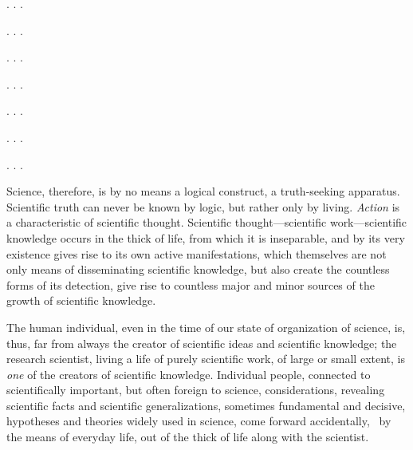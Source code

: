 \Section %

. . .

\Section %

. . .

\Section %

. . .

\Section %

. . .

\Section %

. . .

\Section %

. . .

\Section %

. . .

\Section %
Science, therefore, is by no means a logical construct, a truth-seeking
apparatus.  Scientific truth can never be known by logic, but rather only by
living.  \emph{Action }is a characteristic of scientific thought.  Scientific
thought---scientific work---scientific knowledge occurs in the thick of life,
from which it is inseparable, and by its very existence gives rise to its own
active manifestations, which themselves are not only means of disseminating
scientific knowledge, but also create the countless forms of its detection,
give rise to countless major and minor sources of the growth of scientific
knowledge.

The human individual, even in the time of our state of organization of science,
is, thus, far from always the creator of scientific ideas and scientific
knowledge; the research scientist, living a life of purely scientific work, of
large or small extent, is \emph{one} of the creators of scientific knowledge.
Individual people, connected to scientifically important, but often foreign to
science, considerations, revealing scientific facts and scientific
generalizations, sometimes fundamental and decisive, hypotheses and theories
widely used in science, come forward accidentally, \ie\ by the means of
everyday life, out of the thick of life along with the scientist.

